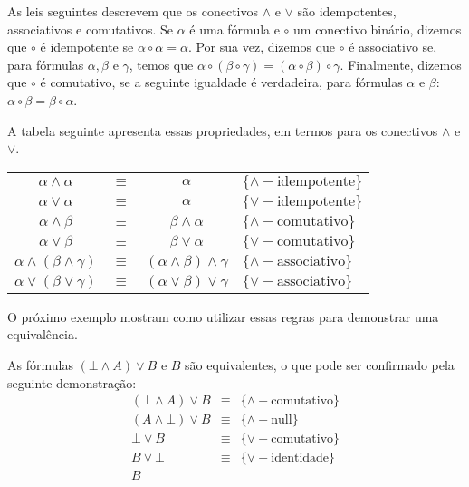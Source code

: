 As leis seguintes descrevem que os conectivos $\land$ e $\lor$ são
idempotentes, associativos e comutativos. Se $\alpha$ é uma fórmula e
$\circ$ um conectivo binário, dizemos que $\circ$ é idempotente se
$\alpha\circ \alpha = \alpha$. Por sua vez, dizemos que $\circ$ é
associativo se, para fórmulas $\alpha,\beta$ e $\gamma$, temos que
$\alpha \circ (\beta\circ \gamma) = (\alpha \circ \beta)\circ
\gamma$. Finalmente, dizemos que $\circ$ é comutativo, se a seguinte
igualdade é verdadeira, para fórmulas $\alpha$ e $\beta$: $\alpha
\circ \beta = \beta \circ \alpha$.

A tabela seguinte apresenta essas propriedades, em termos para os
conectivos $\land$ e $\lor$.

\begin{table}[h]
    \begin{tabular}{|cccl|}
         \hline
             $\alpha \land \alpha$ & $\equiv$ & $\alpha$ &
             $\{\land-\text{idempotente}\}$\\
             $\alpha \lor \alpha$ & $\equiv$ & $\alpha$ &
             $\{\lor-\text{idempotente}\}$\\
             $\alpha \land \beta$ & $\equiv$ & $\beta \land \alpha$ &
             $\{\land-\text{comutativo}\}$\\
             $\alpha \lor \beta$ & $\equiv$ & $\beta \lor \alpha$ &
             $\{\lor-\text{comutativo}\}$\\
             $\alpha\land(\beta\land\gamma)$ & $\equiv$ &  $(\alpha \land
             \beta)\land\gamma$ & $\{\land-\text{associativo}\}$\\
             $\alpha\lor(\beta\lor\gamma)$ & $\equiv$ &  $(\alpha \lor
             \beta)\lor\gamma$ & $\{\lor-\text{associativo}\}$\\
         \hline
    \end{tabular}
     \centering
\end{table}

O próximo exemplo mostram como utilizar essas regras para
demonstrar uma equivalência.

\begin{Example}
As fórmulas $(\bot \land A)\lor B$ e $B$ são equivalentes, o que pode
ser confirmado pela seguinte demonstração:
\[
\begin{array}{lcl}
(\bot\land A)\lor B & \equiv & \{\land-\text{comutativo}\}\\
(A\land \bot)\lor B & \equiv & \{\land-\text{null}\}\\
\bot \lor B & \equiv & \{\lor-\text{comutativo}\}\\
B\lor \bot & \equiv & \{\lor-\text{identidade}\}\\
B
\end{array}
\]
\end{Example}

